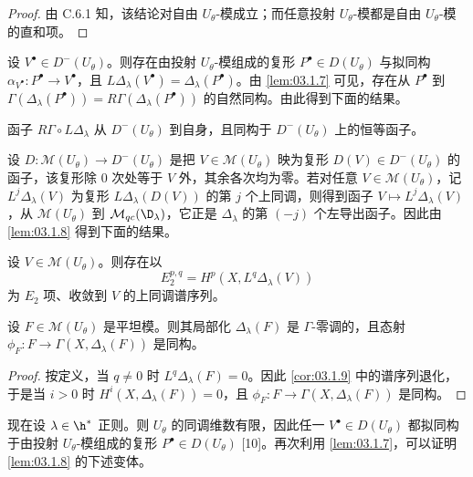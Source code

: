 \begin{proof}
由 C.6.1 知，该结论对自由 $U_\theta$-模成立；而任意投射 $U_\theta$-模都是自由 $U_\theta$-模的直和项。
\end{proof}

设 $V^\bullet\in D^-(U_\theta)$。则存在由投射 $U_\theta$-模组成的复形 $P^\bullet\in D(U_\theta)$ 与拟同构 $\alpha_{V^\bullet}:P^\bullet\to V^\bullet$，且 $L\Delta_\lambda(V^\bullet)=\Delta_\lambda(P^\bullet)$。由 \ref{lem:03.1.7} 可见，存在从 $P^\bullet$ 到 $\Gamma(\Delta_\lambda(P^\bullet))=R\Gamma(\Delta_\lambda(P^\bullet))$ 的自然同构。由此得到下面的结果。

\begin{lemma}\label{lem:03.1.8}
函子 $R\Gamma\circ L\Delta_\lambda$ 从 $D^-(U_\theta)$ 到自身，且同构于 $D^-(U_\theta)$ 上的恒等函子。
\end{lemma}

设 $D:\mathcal{M}(U_\theta)\to D^-(U_\theta)$ 是把 $V\in\mathcal{M}(U_\theta)$ 映为复形 $D(V)\in D^-(U_\theta)$ 的函子，该复形除 $0$ 次处等于 $V$ 外，其余各次均为零。若对任意 $V\in\mathcal{M}(U_\theta)$，记 $L^j\Delta_\lambda(V)$ 为复形 $L\Delta_\lambda(D(V))$ 的第 $j$ 个上同调，则得到函子 $V\mapsto L^j\Delta_\lambda(V)$，从 $\mathcal{M}(U_\theta)$ 到 $\mathcal{M}_{qc}(\D_\lambda)$，它正是 $\Delta_\lambda$ 的第 $(-j)$ 个左导出函子。因此由 \ref{lem:03.1.8} 得到下面的结果。

\begin{corollary}\label{cor:03.1.9}
设 $V\in\mathcal{M}(U_\theta)$。则存在以
$$E_2^{p,q}=H^p(X,L^q\Delta_\lambda(V))$$
为 $E_2$ 项、收敛到 $V$ 的上同调谱序列。
\end{corollary}

\begin{corollary}\label{cor:03.1.10}
设 $F\in\mathcal{M}(U_\theta)$ 是平坦模。则其局部化 $\Delta_\lambda(F)$ 是 $\Gamma$-零调的，且态射 $\phi_F:F\to\Gamma(X,\Delta_\lambda(F))$ 是同构。
\end{corollary}

\begin{proof}
按定义，当 $q\ne 0$ 时 $L^q\Delta_\lambda(F)=0$。因此 \ref{cor:03.1.9} 中的谱序列退化，于是当 $i>0$ 时 $H^i(X,\Delta_\lambda(F))=0$，且 $\phi_F:F\to\Gamma(X,\Delta_\lambda(F))$ 是同构。
\end{proof}

现在设 $\lambda\in\h^*$ 正则。则 $U_\theta$ 的同调维数有限，因此任一 $V^\bullet\in D(U_\theta)$ 都拟同构于由投射 $U_\theta$-模组成的复形 $P^\bullet\in D(U_\theta)$ [10]。再次利用 \ref{lem:03.1.7}，可以证明 \ref{lem:03.1.8} 的下述变体。

